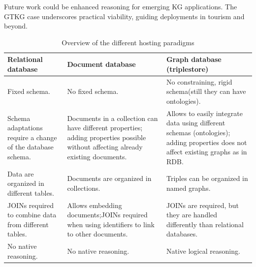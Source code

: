 \documentclass[12pt]{article}
\begin{document}
Future work could be enhanced reasoning for emerging KG applications. The GTKG case underscores practical viability, guiding deployments in tourism and beyond.


\begin{table}[htbp]  %
    \centering
    \caption{Overview of the different hosting paradigms}  %
    \label{tab:overview}  %
    \begin{tabularx}{\textwidth}{|X|X|X|}  %
        \hline  %
        Relational database                                         & Document database                                                                                                                 & Graph database (triplestore)                                                                                                       \\  %
        \hline
        Fixed schema.                                               & No fixed schema.                                                                                                                  & No constraining, rigid schema(still they can have ontologies).                                                                     \\
        \hline
        Schema adaptations require a change of the database schema. & Documents in a collection can have different properties; adding properties possible without affecting already existing documents. & Allows to easily integrate data using different schemas (ontologies); adding properties does not affect existing graphs as in RDB. \\
        \hline
        Data are organized in different tables.                     & Documents are organized in collections.                                                                                           & Triples can be organized in named graphs.                                                                                          \\
        \hline
        JOINs required to combine data from different tables.       & Allows embedding documents;JOINs required when using identifiers to link to other documents.                                      & JOINs are required, but they are handled differently than relational databases.                                                    \\
        \hline  %
        No native reasoning.                                        & No native reasoning.                                                                                                              & Native logical reasoning.                                                                                                          \\
        \hline
    \end{tabularx}
\end{table}

\small

\end{document}
